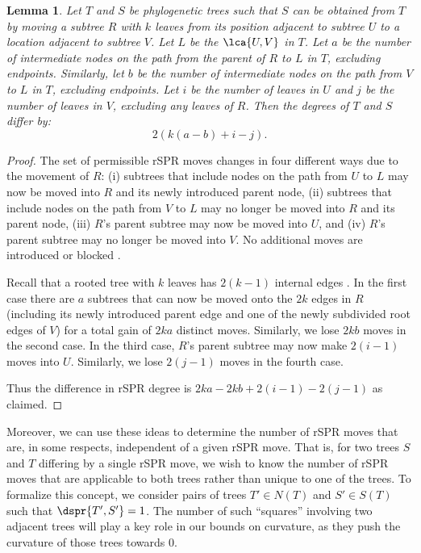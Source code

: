 \documentclass[11pt,onecolumn,conference]{IEEEtran}
\newtheorem{lemma}[theorem]{Lemma}
\newcommand{\cuttable}[2][]{%
    \ifthenelse{\equal{#1}{}}%
		{}%
		{#1}%
}
\begin{document}
\begin{lemma}
\label{lem:degree_change}
Let $T$ and $S$ be phylogenetic trees such that $S$ can be obtained from $T$ by moving a subtree $R$ with $k$ leaves from its position adjacent to subtree $U$ to a location adjacent to subtree $V$.
Let $L$ be the $\lca{U,V}$ in $T$.
Let $a$ be the number of intermediate nodes on the path from the parent of $R$ to $L$ in $T$, excluding endpoints.
Similarly, let $b$ be the number of intermediate nodes on the path from $V$ to $L$ in $T$, excluding endpoints.
Let $i$ be the number of leaves in $U$ and $j$ be the number of leaves in $V$, excluding any leaves of $R$.
Then the degrees of $T$ and $S$ differ by:
$$2\left(k(a-b) + i - j\right).$$

\end{lemma}
\begin{proof}
The set of permissible rSPR moves changes in four different ways due to the movement of $R$:
(i) subtrees that include nodes on the path from $U$ to $L$ may now be moved into $R$ and its newly introduced parent node,
(ii) subtrees that include nodes on the path from $V$ to $L$ may no longer be moved into $R$ and its parent node,
(iii) $R$'s parent subtree may now be moved into $U$, and
(iv) $R$'s parent subtree may no longer be moved into $V$.
No additional moves are introduced or blocked\cuttable{ by the original rSPR operation on $R$}.

Recall that a rooted tree with $k$ leaves has $2(k-1)$ internal edges\cuttable{(recall that we are excluding any ``root edge'' in these calculations)}.
In the first case there are $a$ subtrees that can now be moved onto the $2k$ edges in $R$ (including its newly introduced parent edge and one of the newly subdivided root edges of $V$) for a total gain of $2ka$ distinct moves.
Similarly, we lose $2kb$ moves in the second case.
In the third case, $R$'s parent subtree may now make $2(i-1)$ moves into $U$.
Similarly, we lose $2(j-1)$ moves in the fourth case.

Thus the difference in rSPR degree is $2ka - 2kb + 2(i-1) - 2(j-1)$ as claimed.
\end{proof}

Moreover, we can use these ideas to determine the number of rSPR moves that are, in some respects, independent of a given rSPR move.
That is, for two trees $S$ and $T$ differing by a single rSPR move, we wish to know the number of rSPR moves that are applicable to both trees rather than unique to one of the trees.
To formalize this concept, we consider pairs of trees $T' \in N(T)$ and $S' \in S(T)$ such that $\dspr{T',S'} = 1$.
The number of such ``squares'' involving two adjacent trees will play a key role in our bounds on curvature, as they push the curvature of those trees towards 0.
\end{document}
